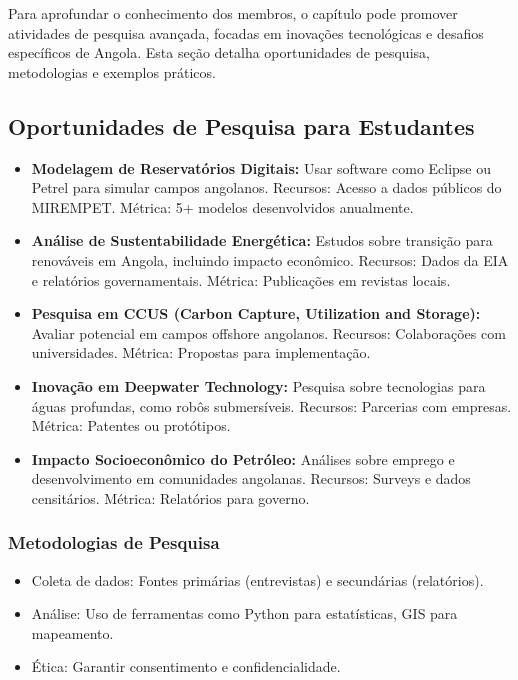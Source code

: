 \documentclass[12pt]{article}
\begin{document}
Para aprofundar o conhecimento dos membros, o capítulo pode promover atividades de pesquisa avançada, focadas em inovações tecnológicas e desafios específicos de Angola. Esta seção detalha oportunidades de pesquisa, metodologias e exemplos práticos.

\subsection{Oportunidades de Pesquisa para Estudantes}
\begin{itemize}
    \item \textbf{Modelagem de Reservatórios Digitais:} Usar software como Eclipse ou Petrel para simular campos angolanos. Recursos: Acesso a dados públicos do MIREMPET. Métrica: 5+ modelos desenvolvidos anualmente.
    \item \textbf{Análise de Sustentabilidade Energética:} Estudos sobre transição para renováveis em Angola, incluindo impacto econômico. Recursos: Dados da EIA e relatórios governamentais. Métrica: Publicações em revistas locais.
    \item \textbf{Pesquisa em CCUS (Carbon Capture, Utilization and Storage):} Avaliar potencial em campos offshore angolanos. Recursos: Colaborações com universidades. Métrica: Propostas para implementação.
    \item \textbf{Inovação em Deepwater Technology:} Pesquisa sobre tecnologias para águas profundas, como robôs submersíveis. Recursos: Parcerias com empresas. Métrica: Patentes ou protótipos.
    \item \textbf{Impacto Socioeconômico do Petróleo:} Análises sobre emprego e desenvolvimento em comunidades angolanas. Recursos: Surveys e dados censitários. Métrica: Relatórios para governo.
\end{itemize}

\subsubsection{Metodologias de Pesquisa}
\begin{itemize}
    \item Coleta de dados: Fontes primárias (entrevistas) e secundárias (relatórios).
    \item Análise: Uso de ferramentas como Python para estatísticas, GIS para mapeamento.
    \item Ética: Garantir consentimento e confidencialidade.
\end{itemize}
\end{document}
